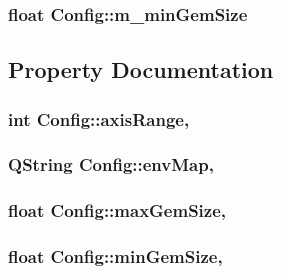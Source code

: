 \subsubsection[{m\+\_\+min\+Gem\+Size}]{\setlength{\rightskip}{0pt plus 5cm}float Config\+::m\+\_\+min\+Gem\+Size\hspace{0.3cm}{\ttfamily [protected]}}\label{class_config_a7284f245054875419777e7cbad67183c}


\subsection{Property Documentation}
\hypertarget{class_config_a5068b92866fd941b72314c6c7f36145f}{}
\subsubsection[{axis\+Range}]{\setlength{\rightskip}{0pt plus 5cm}int Config\+::axis\+Range\hspace{0.3cm}{\ttfamily [read]}, {\ttfamily [write]}}\label{class_config_a5068b92866fd941b72314c6c7f36145f}
\hypertarget{class_config_ae85b2124ed4685d081068c6028081d28}{}
\subsubsection[{env\+Map}]{\setlength{\rightskip}{0pt plus 5cm}Q\+String Config\+::env\+Map\hspace{0.3cm}{\ttfamily [read]}, {\ttfamily [write]}}\label{class_config_ae85b2124ed4685d081068c6028081d28}
\hypertarget{class_config_a9e631288322234538f08c601202c0dba}{}
\subsubsection[{max\+Gem\+Size}]{\setlength{\rightskip}{0pt plus 5cm}float Config\+::max\+Gem\+Size\hspace{0.3cm}{\ttfamily [read]}, {\ttfamily [write]}}\label{class_config_a9e631288322234538f08c601202c0dba}
\hypertarget{class_config_a26688d51537cbea3ee27810b3f6d1568}{}
\subsubsection[{min\+Gem\+Size}]{\setlength{\rightskip}{0pt plus 5cm}float Config\+::min\+Gem\+Size\hspace{0.3cm}{\ttfamily [read]}, {\ttfamily [write]}}\label{class_config_a26688d51537cbea3ee27810b3f6d1568}


